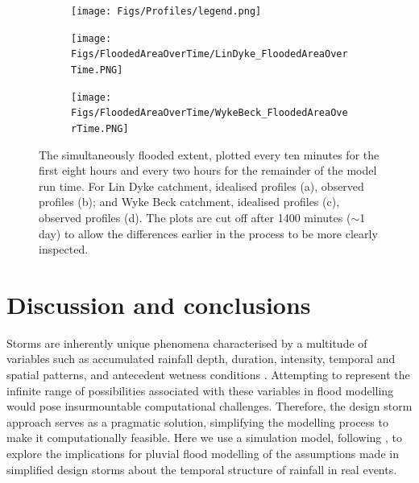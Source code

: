 \documentclass[APA,Times2COL]{WileyNJDv5}
\begin{document}
\begin{figure}[!t] 
\begin{subfigure}[H]{\linewidth}
\texttt{[image: Figs/Profiles/legend.png]}
 \end{subfigure}
\begin{subfigure}[H]{\linewidth}
\texttt{[image: Figs/FloodedAreaOverTime/LinDyke\_FloodedAreaOverTime.PNG]}
 \end{subfigure}
\begin{subfigure}[H]{\linewidth}
\texttt{[image: Figs/FloodedAreaOverTime/WykeBeck\_FloodedAreaOverTime.PNG]}
 \end{subfigure}
  \caption{The simultaneously flooded extent, plotted every ten minutes for the first eight hours and every two hours for the remainder of the model run time. For Lin Dyke catchment, idealised profiles (a), observed profiles (b); and Wyke Beck catchment, idealised profiles (c), observed profiles (d). The plots are cut off after 1400 minutes ($\sim$1 day) to allow the differences earlier in the process to be more clearly inspected. }\label{fig:flooded_area_over_time} 
\end{figure}

\section{Discussion and conclusions}\label{sec:discussion}

Storms are inherently unique phenomena characterised by a multitude of variables such as accumulated rainfall depth, duration, intensity, temporal and spatial patterns, and antecedent wetness conditions \citep{loveridge2018monte}. Attempting to represent the infinite range of possibilities associated with these variables in flood modelling would pose insurmountable computational challenges. Therefore, the design storm approach serves as a pragmatic solution, simplifying the modelling process to make it computationally feasible. Here we use a simulation model, following \citet{beven1989changing}, to explore the implications for pluvial flood modelling of the assumptions made in simplified design storms about the temporal structure of rainfall in real events. 
\end{document}
